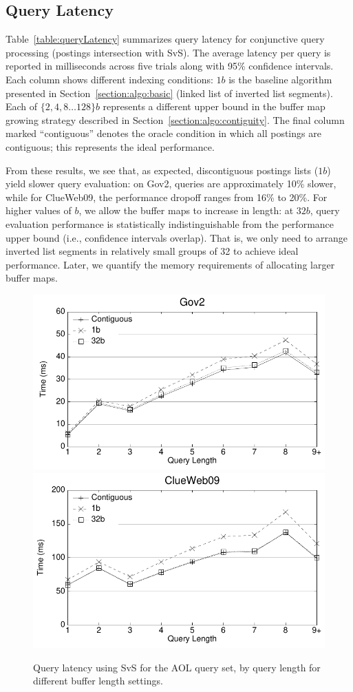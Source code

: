 \subsection{Query Latency}

Table~\ref{table:queryLatency} summarizes query latency for conjunctive query processing (postings intersection with SvS). The average latency per query is reported in milliseconds across five trials along with 95\% confidence intervals. Each column shows different indexing conditions: $1b$ is the baseline algorithm presented in Section~\ref{section:algo:basic} (linked list of inverted list segments). Each of $\{2, 4, 8 \ldots 128\}b$ represents a different upper bound in the buffer map growing strategy described in Section~\ref{section:algo:contiguity}. The final column marked ``contiguous'' denotes the oracle condition in which all postings are contiguous; this represents the ideal performance.

From these results, we see that, as expected, discontiguous postings lists ($1b$) yield slower query evaluation: on Gov2, queries are approximately 10\% slower, while for ClueWeb09, the performance dropoff ranges from 16\% to 20\%.  For higher values of $b$, we allow the buffer maps to increase in length: at $32b$, query evaluation performance is statistically indistinguishable from the performance upper bound (i.e., confidence intervals overlap). That is, we only need to arrange inverted list segments in relatively small groups of 32 to achieve ideal performance. Later, we quantify the memory requirements of allocating larger buffer maps.

\begin{figure}[t]
  \includegraphics[width=0.49\linewidth]{Figures/latency_gov2_aol.pdf}
  \includegraphics[width=0.49\linewidth]{Figures/latency_clue_aol.pdf}
  \caption{Query latency using SvS for the AOL query set, by query length for different buffer length settings.
  \label{figure:queryLatency}}
\end{figure}

